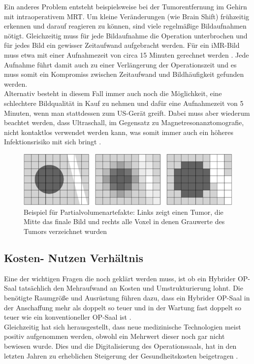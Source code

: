 Ein anderes Problem entsteht beispielsweise bei der Tumorentfernung im Gehirn mit intraoperativem MRT. Um kleine Veränderungen (wie Brain Shift) frühzeitig erkennen und darauf reagieren zu können, sind viele regelmäßige Bildaufnahmen nötigt. Gleichzeitig muss für jede Bildaufnahme die Operation unterbrochen und für jedes Bild ein gewisser Zeitaufwand aufgebracht werden. Für ein iMR-Bild muss etwa mit einer Aufnahmezeit von circa 15 Minuten gerechnet werden \cite{BrainShiftInTumorResection}. Jede Aufnahme führt damit auch zu einer Verlängerung der Operationszeit und es muss somit ein Kompromiss zwischen Zeitaufwand und Bildhäufigkeit gefunden werden.\\
Alternativ besteht in diesem Fall immer auch noch die Möglichkeit, eine schlechtere Bildqualität in Kauf zu nehmen und dafür eine Aufnahmezeit von 5 Minuten, wenn man stattdessen zum US-Gerät greift. Dabei muss aber wiederum beachtet werden, dass Ultraschall, im Gegensatz zu Magnetresonanztomografie, nicht kontaktlos verwendet werden kann, was somit immer auch ein höheres Infektionsrisiko mit sich bringt \cite{BrainShiftInTumorResection}.

\begin{figure} [H]
	\includegraphics[scale = 0.7]{Content/Pictures/partial.png}
	\caption{Beispiel für Partialvolumenartefakte: Links zeigt einen Tumor, die Mitte das finale Bild und rechts alle Voxel in denen Grauwerte des Tumors verzeichnet wurden \cite{DerDigitaleOperationssaal}}
	\label{fig:partial}
\end{figure}

\subsection{Kosten- Nutzen Verhältnis}

Eine der wichtigen Fragen die noch geklärt werden muss, ist ob ein Hybrider OP-Saal tatsächlich den Mehraufwand an Kosten und Umstrukturierung lohnt. Die benötigte Raumgröße und Ausrüstung führen dazu, dass ein Hybrider OP-Saal in der Anschaffung mehr als doppelt so teuer und in der Wartung fast doppelt so teuer wie ein konventioneller OP-Saal ist \cite{HybridOR}. \\
Gleichzeitig hat sich herausgestellt, dass neue medizinische Technologien meist positiv aufgenommen werden, obwohl ein Mehrwert dieser noch gar nicht bewiesen wurde. Dies und die Digitalisierung des Operationssaals, hat in den letzten Jahren zu erheblichen Steigerung der Gesundheitskosten beigetragen \cite{DerDigitaleOperationssaal}.

